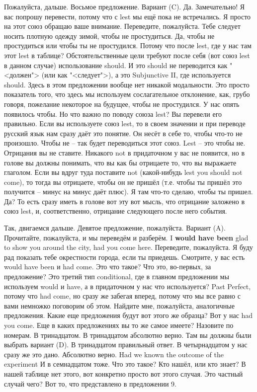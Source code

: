\documentclass[main.tex]{subfiles}
\begin{document}
Пожалуйста, дальше.
Восьмое предложение.
Вариант (C).
Да.
Замечательно!
Я вас попрошу перевести, потому что с lest мы ещё пока не встречались.
Я просто на этот союз обращаю ваше внимание.
Переведите, пожалуйста.
Тебе следует носить плотную одежду зимой, чтобы не простудиться.
Да, чтобы не простудиться или чтобы ты не простудился.
Потому что после lest, где у нас там этот lest в таблице?
Обстоятельственные цели требуют после себя (вот союз lest в данном случае) использование should.
И это should не переводится как "<должен"> (или как "<следует">), а это Subjunctive II, где используется should.
Здесь в этом предложении вообще нет никакой модальности.
Это просто показатель того, что здесь мы используем сослагательное отклонение, как, грубо говоря, пожелание некоторое на будущее, чтобы не простудился.
У нас опять появилось чтобы.
Но что важно по поводу союза lest?
Вы перевели его правильно.
Если вы используете союз lest, то в своем значении и при переводе русский язык нам сразу даёт это понятие.
Он несёт в себе то, чтобы что-то не произошло.
Чтобы не -- так будет переводиться этот союз.
Lest -- это чтобы не.
Отрицания вы не ставите.
Никакого not в придаточном у вас не появится, но в голове вы должны понимать, что вы как бы отрицаете то, что вы выражаете глаголом.
Если вы вдруг туда поставите not (какой-нибудь lest you should not come), то тогда вы отрицаете, чтобы он не пришёл (т.е. чтобы ты пришёл это получится -- минус на минус даёт плюс).
Я там что-то сделаю, чтобы ты пришел.
Да?
То есть сразу иметь в голове вот эту вот мысль, что отрицание заложено в союз lest, и, соответственно, отрицание следующего после него события.

Так, двигаемся дальше.
Девятое предложение, пожалуйста.
Вариант (A).
Прочитайте, пожалуйста, и мы переведём и разберём.
I \textbf{would have been} glad to show you around the city, had you come here.
Переведите, пожалуйста.
Я буду рад показать тебе окрестности города, если ты приедешь.
Смотрите, у вас есть would have been и had come.
Это что такое?
Что это, во-первых, за предложение?
Это третий тип conditional, где в главном предложении мы используем would и have, а в придаточном у нас что используется?
Past Perfect, потому что had come, но сразу же забегая вперед, потому что мы все равно с вами немножко поговорим об этом.
Найдите мне, пожалуйста, аналогичные предложения.
Какие еще предложения будут вот этого же образца?
Вот у нас had you come.
Еще в каких предложениях вы то же самое имеете?
Назовите по номерам.
В тринадцатом.
В тринадцатом абсолютно верно.
Там вы должны были выбрать вариант (D).
В тринадцатом правильный ответ.
В четырнадцатом у нас сразу же это дано.
Абсолютно верно.
Had we known the outcome of the experiment
И в семнадцатом тоже.
Что это такое?
Кто нашёл, или кто знает?
В нашей таблице нет этого, вот конкретно просто вот этого случая.
Это частный случай чего?
Вот то, что представлено в предложении 9.
\end{document}
